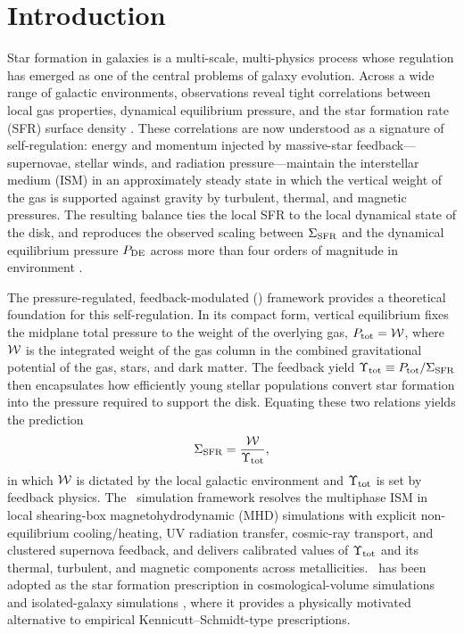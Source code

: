 \section{Introduction}
\label{sec:intro}

Star formation in galaxies is a multi-scale, multi-physics process whose
regulation has emerged as one of the central problems of galaxy evolution.
Across a wide range of galactic environments, observations reveal tight
correlations between local gas properties, dynamical equilibrium pressure,
and the star formation rate (SFR) surface density
\citep{2010ApJ...721..975O,2011ApJ...731...41O,2020ApJ...892..148S,2022ApJ...936..137O}.
These correlations are now understood as a signature of self-regulation:
energy and momentum injected by massive-star feedback---supernovae, stellar
winds, and radiation pressure---maintain the interstellar medium (ISM) in
an approximately steady state in which the vertical weight of the gas is
supported against gravity by turbulent, thermal, and magnetic pressures.
The resulting balance ties the local SFR to the local dynamical state of
the disk, and reproduces the observed scaling between $\Sigma_{\rm SFR}$ and the
dynamical equilibrium pressure $P_{\rm DE}$ across more than four orders of
magnitude in environment
\citep{2020ApJ...892..148S,2023ApJ...945L..19S,2025ApJ...989...66V}.

The pressure-regulated, feedback-modulated (\PRFM) framework
\citep{2022ApJ...936..137O} provides a theoretical foundation for this
self-regulation. In its compact form, vertical equilibrium fixes the
midplane total pressure to the weight of the overlying gas, $P_{\rm tot} = \mathcal{W}$,
where $\mathcal{W}$ is the integrated weight of the gas column in the combined
gravitational potential of the gas, stars, and dark matter. The feedback
yield $\Upsilon_{\rm tot} \equiv P_{\rm tot}/\Sigma_{\rm SFR}$ then encapsulates how efficiently young
stellar populations convert star formation into the pressure required to
support the disk. Equating these two relations yields the prediction
\begin{equation}
  \Sigma_{\rm SFR} = \frac{\mathcal{W}}{\Upsilon_{\rm tot}},
  \label{eq:prfm}
\end{equation}
in which $\mathcal{W}$ is dictated by the local galactic environment and $\Upsilon_{\rm tot}$ is
set by feedback physics. The \TIGRESS\ simulation framework
\citep{2024ApJ...972...67K} resolves the multiphase ISM in local
shearing-box magnetohydrodynamic (MHD) simulations with explicit
non-equilibrium cooling/heating, UV radiation transfer, cosmic-ray
transport, and clustered supernova feedback, and delivers calibrated values
of $\Upsilon_{\rm tot}$ and its thermal, turbulent, and magnetic components across
metallicities. \PRFM\ has been adopted as the star formation prescription
in cosmological-volume simulations \citep{2024ApJ...975..151H} and
isolated-galaxy simulations \citep{2024ApJ...975..113J}, where it provides
a physically motivated alternative to empirical Kennicutt--Schmidt-type
prescriptions.

